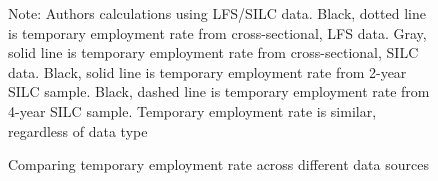 \begin{figure}
    \caption{Comparing temporary employment rate across different data sources}
    \label{graph_eu_silc_compare_SILC_LFS}
    \footnotesize{Note: Authors calculations using LFS/SILC data.  Black, dotted line is temporary employment rate from cross-sectional, LFS data.  Gray, solid line is temporary employment rate from cross-sectional, SILC data.  Black, solid line is temporary employment rate from 2-year SILC sample.  Black, dashed line is temporary employment rate from 4-year SILC sample.  Temporary employment rate is similar, regardless of data type}
\end{figure}

